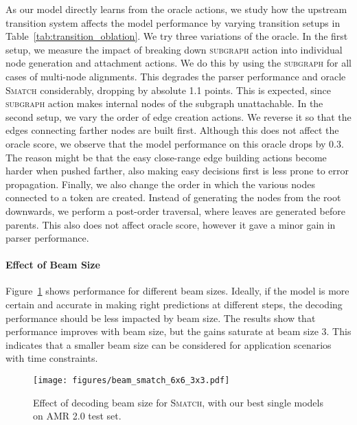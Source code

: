 As our model directly learns from the oracle actions, we study how the upstream transition system affects the model performance by varying transition setups in Table~\ref{tab:transition_oblation}.
We try three variations of the oracle. In the first setup, we measure the impact of breaking down \textsc{subgraph} action into individual node generation and attachment actions. We do this by using the \textsc{subgraph} for all cases of multi-node alignments. This degrades the parser performance and oracle \textsc{Smatch} considerably, dropping by absolute 1.1 points. This is expected, since \textsc{subgraph} action makes internal nodes of the subgraph unattachable. In the second setup, we vary the order of edge creation actions. We reverse it so that the edges connecting farther nodes are built first. Although this does not affect the oracle score, we observe that the model performance on this oracle drops by 0.3. The reason might be that the easy close-range edge building actions become harder when pushed farther, also making easy decisions first is less prone to error propagation. Finally, we also change the order in which the various nodes connected to a token are created. Instead of generating the nodes from the root downwards, we perform a post-order traversal, where leaves are generated before parents. This also does not affect oracle score, however it gave a minor gain in parser performance. 





\paragraph{Effect of Beam Size}
Figure~\ref{fig:beam} shows performance for different beam sizes. Ideally, if the model is more certain and accurate in making right predictions at different steps, the decoding performance should be less impacted by beam size. The results show that performance improves with beam size, but the gains saturate at beam size 3. This indicates that a smaller beam size can be considered for application scenarios with time constraints.
































\begin{figure}[!t]
    \centering
\texttt{[image: figures/beam\_smatch\_6x6\_3x3.pdf]}
    \caption{Effect of decoding beam size for \textsc{Smatch}, with our best single models on AMR 2.0 test set.}
    \label{fig:beam}
\end{figure}
